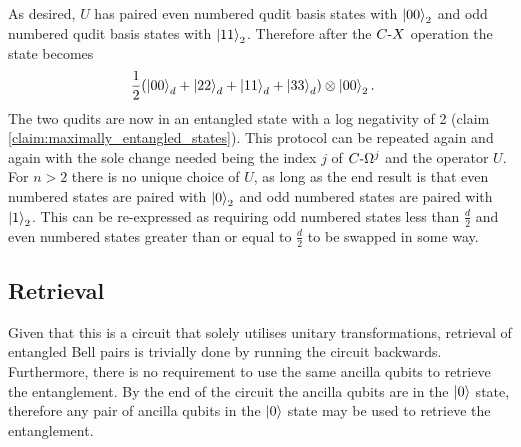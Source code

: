 As desired, $U$ has paired even numbered qudit basis states with $\ket{00}_2$ and odd numbered qudit basis states with $\ket{11}_2$.
Therefore after the $C\text{-}X$ operation the state becomes
\begin{align}
    &\frac{1}{2}
    (\ket{00}_d + \ket{22}_d + \ket{11}_d + \ket{33}_d)
    \otimes\ket{00}_2.
\end{align}
The two qudits are now in an entangled state with a log negativity of 2 (claim \ref{claim:maximally_entangled_states}).
This protocol can be repeated again and again with the sole change needed being the index $j$ of $C\text{-}\Omega^j$ and the operator $U$.
For $n>2$ there is no unique choice of $U$, as long as the end result is that even numbered states are paired with $\ket{0}_2$ and odd numbered states are paired with $\ket{1}_2$.
This can be re-expressed as requiring odd numbered states less than $\frac{d}{2}$ and even numbered states greater than or equal to $\frac{d}{2}$ to be swapped in some way.

\subsection{Retrieval}
\label{subsection:aqcretrieval}
Given that this is a circuit that solely utilises unitary transformations, retrieval of entangled Bell pairs is trivially done by running the circuit backwards. Furthermore, there is no requirement to use the same ancilla qubits to retrieve the entanglement. By the end of the circuit the ancilla qubits are in the $\ket{0}$ state, therefore any pair of ancilla qubits in the $\ket{0}$ state may be used to retrieve the entanglement.